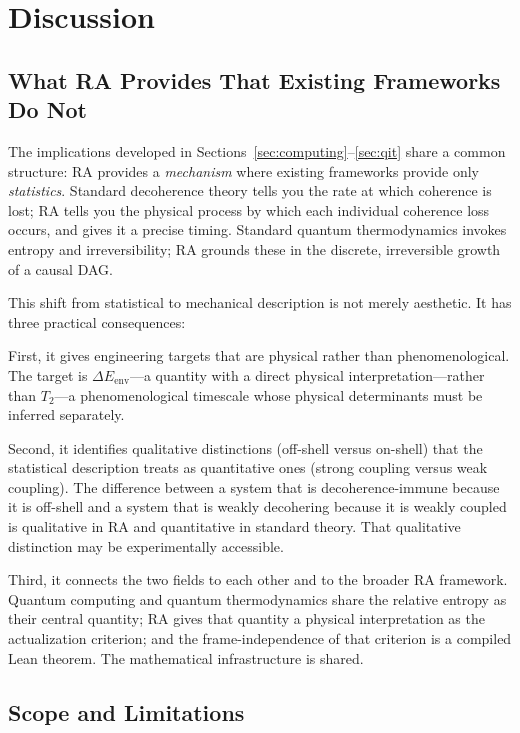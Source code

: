 \documentclass[11pt,a4paper]{article}
\theoremstyle{plain}
\theoremstyle{definition}
\theoremstyle{remark}
\begin{document}
\section{Discussion}
\label{sec:discussion}

\subsection{What RA Provides That Existing Frameworks Do Not}

The implications developed in Sections~\ref{sec:computing}--\ref{sec:qit} share a
common structure: RA provides a \emph{mechanism} where existing frameworks provide
only \emph{statistics}. Standard decoherence theory tells you the rate at which
coherence is lost; RA tells you the physical process by which each individual
coherence loss occurs, and gives it a precise timing. Standard quantum
thermodynamics invokes entropy and irreversibility; RA grounds these in the
discrete, irreversible growth of a causal DAG.

This shift from statistical to mechanical description is not merely aesthetic.
It has three practical consequences:

First, it gives engineering targets that are physical rather than phenomenological.
The target is $\Delta E_{\mathrm{env}}$---a quantity with a direct physical
interpretation---rather than $T_2$---a phenomenological timescale whose physical
determinants must be inferred separately.

Second, it identifies qualitative distinctions (off-shell versus on-shell) that the
statistical description treats as quantitative ones (strong coupling versus weak
coupling). The difference between a system that is decoherence-immune because it
is off-shell and a system that is weakly decohering because it is weakly coupled is
qualitative in RA and quantitative in standard theory. That qualitative distinction
may be experimentally accessible.

Third, it connects the two fields to each other and to the broader RA framework.
Quantum computing and quantum thermodynamics share the relative entropy as their
central quantity; RA gives that quantity a physical interpretation as the
actualization criterion; and the frame-independence of that criterion is a compiled
Lean theorem. The mathematical infrastructure is shared.

\subsection{Scope and Limitations}
\end{document}
